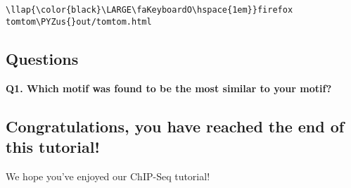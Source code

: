 \documentclass[11pt]{article}
\def\PYZus{\char`\_}
\begin{document}
\begin{terminalinput}
\begin{Verbatim}[commandchars=\\\{\}]
\llap{\color{black}\LARGE\faKeyboardO\hspace{1em}}firefox tomtom\PYZus{}out/tomtom.html
\end{Verbatim}
\end{terminalinput}



    \hypertarget{questions}{%
\subsection{Questions}\label{questions}}

\textbf{Q1. Which motif was found to be the most similar to your motif?}

    \hypertarget{congratulations-you-have-reached-the-end-of-this-tutorial}{%
\subsection{Congratulations, you have reached the end of this
tutorial!}\label{congratulations-you-have-reached-the-end-of-this-tutorial}}

We hope you've enjoyed our ChIP-Seq tutorial!


\end{document}
